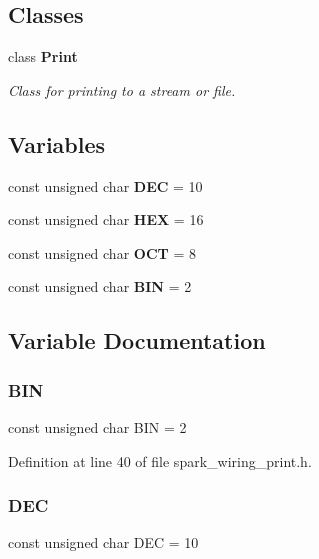 \subsection*{Classes}
\begin{DoxyCompactItemize}
\item 
class \textbf{ Print}
\begin{DoxyCompactList}\small\item\em Class for printing to a stream or file. \end{DoxyCompactList}\end{DoxyCompactItemize}
\subsection*{Variables}
\begin{DoxyCompactItemize}
\item 
const unsigned char \textbf{ D\+EC} = 10
\item 
const unsigned char \textbf{ H\+EX} = 16
\item 
const unsigned char \textbf{ O\+CT} = 8
\item 
const unsigned char \textbf{ B\+IN} = 2
\end{DoxyCompactItemize}


\subsection{Variable Documentation}
\mbox{\label{test_2gcclib_2spark__wiring__print_8h_aee179d58d1b76a9b42397af886f2f9a4}} 
\subsubsection{B\+IN}
{\footnotesize\ttfamily const unsigned char B\+IN = 2}



Definition at line 40 of file spark\+\_\+wiring\+\_\+print.\+h.

\mbox{\label{test_2gcclib_2spark__wiring__print_8h_a26e216c38cffa0a9965fa7933ba558b1}} 
\subsubsection{D\+EC}
{\footnotesize\ttfamily const unsigned char D\+EC = 10}



